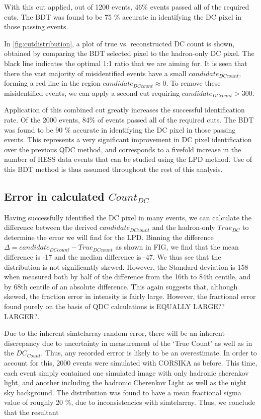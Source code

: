 \documentclass{article}
\begin{document}
With this cut applied, out of 1200 events, 46\% events passed all of the required cuts. The BDT was found to be 75 \% accurate in identifying the DC pixel in those passing events.

In \ref{fig:cutdistribution}, a plot of true vs. reconstructed DC count is shown, obtained by comparing the BDT selected pixel to the hadron-only DC pixel. The black line indicates the optimal 1:1 ratio that we are aiming for. It is seen that there the vast majority of misidentified events have a small $candidate_{DC count}$, forming a red line in the region $candidate_{DC count} \approx 0$. To remove these misidentified events, we can apply a second cut requiring $candidate_{DC count} > 300$.

Application of this combined cut greatly increases the successful identification rate. Of the 2000 events, 84\% of events passed all of the required cuts. The BDT was found to be 90 \% accurate in identifying the DC pixel in those passing events. This represents a very significant improvement in DC pixel identification over the previous QDC method, and corresponds to a fivefold increase in the number of HESS data events that can be studied using the LPD method. Use of this BDT method is thus assumed throughout the rest of this analysis.

\subsection{Error in calculated $Count_{DC}$}
Having successfully identified the DC pixel in many events, we can calculate the difference between the derived $candidate_{DC count}$ and the hadron-only $True_{DC}$ to determine the error we will find for the LPD. Binning the difference $\Delta = candidate_{DC count} - True_{DC count}$ as shown in FIG, we find that the mean difference is -17 and the median difference is -47. We thus see that the distribution is not significantly skewed. However, the Standard deviation is 158 when measured both by half of the difference from the 16th to 84th centile, and by 68th centile of an absolute difference. This again suggests that, although skewed, the fraction error in intensity is fairly large. However, the fractional error found purely on the basis of QDC calculations is EQUALLY LARGE??LARGER?.

Due to the inherent sim\textunderscore telarray random error, there will be an inherent discrepancy due to uncertainty in measurement of the \textquoteleft True Count' as well as in the $DC_{Count}$. Thus, any recorded errror is likely to be an overestimate. In order to account for this, 2000 events were simulated with CORSIKA as before. This time, each event simply contained one simulated image with only hadronic cherenkov light, and another including the hadronic Cherenkov Light as well as the night sky background. The distribution was found to have a mean fractional sigma value of roughly 20 \%, due to inconsistencies with sim\textunderscore telarray. Thus, we conclude that the resultant 
\end{document}

